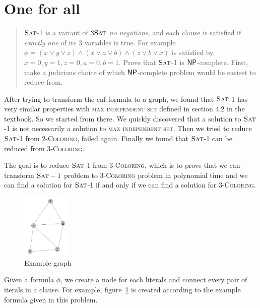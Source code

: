 \section*{One for all }
    \begin{quote}
    $\textsc{Sat}$-1 is a variant of $3\textsc{Sat}$ \emph{no negations}, and each clause is satisfied if \emph{exactly one} of its 3 variables is true.
    For example $\phi = (x \vee y \vee z) \wedge (x \vee a \vee b) \wedge (z \vee b \vee x)$ is satisfied by $x=0,y=1,z=0,a=0,b=1$.
    Prove that $\textsc{Sat}$-1 is $\mathsf{NP}$-complete.
    First, make a judicious choice of which $\mathsf{NP}$-complete problem would be easiest to reduce from.
    \end{quote}

    After trying to transform the cnf formula to a graph, we found that $\textsc{Sat}$-1 has very similar properties with \textsc{max independent set} 
    defined in section 4.2 in the textbook. So we started from there. We quickly discovered that a solution to $\textsc{Sat}$-1 is 
    not necessarily a solution to \textsc{max independent set}. Then we tried to reduce $\textsc{Sat}$-1 from 2-\textsc{Coloring}, failed again. 
    Finally we found that $\textsc{Sat}$-1 can be reduced from 3-\textsc{Coloring}.

    The goal is to reduce $\textsc{Sat}$-1 from 3-\textsc{Coloring}, which is to prove that we can transform $\textsc{Sat}-1$ problem to
    3-\textsc{Coloring} problem in polynomial time and we can find a solution for $\textsc{Sat}$-1 if and only if we can find a 
    solution for 3-\textsc{Coloring}.

    \begin{figure}
        \centering
        \includegraphics[width=0.2\textwidth]{3_figure.png}
        \caption{Example graph}
        \label{fig:ex}
    \end{figure}

    Given a formula $\phi$, we create a node for each literals and connect every pair of iterals in a clause. 
    For example, figure~\ref{fig:ex} is created according to the example formula given in this problem.



